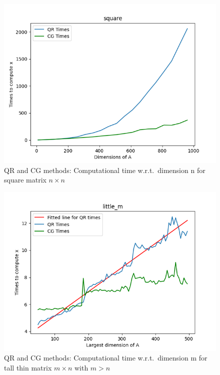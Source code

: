 \documentclass{article}
\begin{document}
        \begin{figure}
            \includegraphics[width=\linewidth]{../results/square.png}
            \caption{QR and CG methods: Computational time w.r.t.\ dimension n for square matrix $n \times n$}
            \label{square}
        \end{figure}
        \begin{figure}
            \includegraphics[width=\linewidth]{../results/little_m.png}
            \caption{QR and CG methods: Computational time w.r.t.\ dimension m for tall thin matrix $m \times n$ with $m > n$}
            \label{little_m}
        \end{figure}
\end{document}
